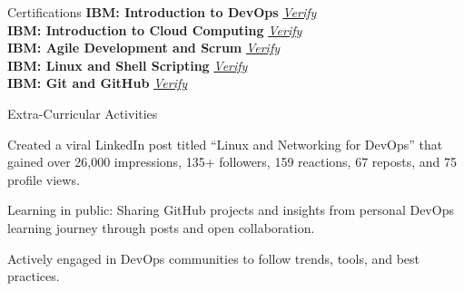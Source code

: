 \documentclass{resume}
\begin{document}
\begin{rSection}{Certifications}
\textbf{IBM: Introduction to DevOps} \hfill \href{https://www.coursera.org/account/accomplishments/verify/OIGBYO6L8GZJ}{\textit{Verify}} \\
\textbf{IBM: Introduction to Cloud Computing} \hfill \href{https://www.coursera.org/account/accomplishments/verify/O4EN4P7ZI6XV}{\textit{Verify}} \\
\textbf{IBM: Agile Development and Scrum} \hfill \href{https://www.coursera.org/account/accomplishments/verify/PV26WR8KH5MX}{\textit{Verify}} \\
\textbf{IBM: Linux and Shell Scripting} \hfill \href{https://www.coursera.org/account/accomplishments/verify/07JX8O7ZPDCY}{\textit{Verify}} \\
\textbf{IBM: Git and GitHub} \hfill \href{https://www.coursera.org/account/accomplishments/verify/6JZJJTDRFPBT}{\textit{Verify}}
\end{rSection}

\begin{rSection}{Extra-Curricular Activities}

\item Created a viral LinkedIn post titled “Linux and Networking for DevOps” that gained over 26,000 impressions, 135+ followers, 159 reactions, 67 reposts, and 75 profile views.

\item Learning in public: Sharing GitHub projects and insights from personal DevOps learning journey through posts and open collaboration.

\item Actively engaged in DevOps communities to follow trends, tools, and best practices.

\end{rSection}
\end{document}

